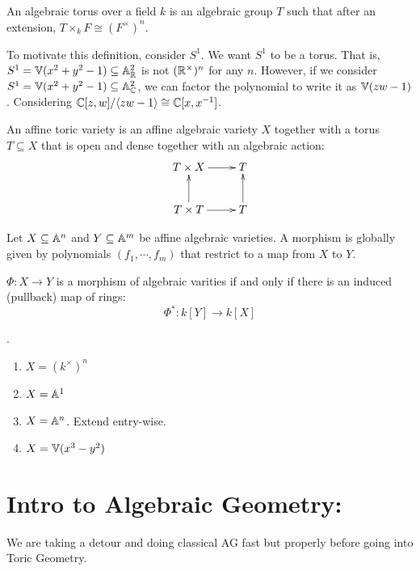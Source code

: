 \documentclass[12pt]{article}
\begin{document}
\begin{definition}
    An algebraic torus over a field $k$ is an algebraic group $T$ such that after an extension, $T \times_k F \cong (F^\times)^n$. 
\end{definition}

\begin{remark}
    To motivate this definition, consider $S^1$. We want $S^1$ to be a torus. That is, $S^1 = \mathbb V(x^2+y^2-1) \subseteq \mathbb A^2_\mathbb R$ is not $(\mathbb R^\times)^n$ for any $n$. However, if we consider $S^1 = \mathbb V(x^2+y^2-1) \subseteq \mathbb A^2_\mathbb C$, we can factor the polynomial to write it as $\mathbb V(zw-1)$. Considering $\mathbb C[z,w]/\langle zw-1\rangle \cong \mathbb C[x, x^{-1}]$. 
\end{remark}

\begin{definition}
    An affine toric variety is an affine algebraic variety $X$ together with a torus $T \subseteq X$ that is open and dense together with an algebraic action: 
    \[ \xymatrix{T \times X \ar[r] & T \\ T \times T \ar[u] \ar[r] & T \ar[u] } \]
\end{definition}

\begin{definition}
    Let $X \subseteq \mathbb A^n$ and $Y \subseteq \mathbb A^m$ be affine algebraic varieties. A morphism is globally given by polynomials $(f_1, \cdots, f_m)$ that restrict to a map from $X$ to $Y$.
\end{definition}

\begin{lemma}
    $\Phi: X \to Y$ is a morphism of algebraic varities if and only if there is an induced (pullback) map of rings: 
    \[ \Phi^*: k[Y] \to k[X]\]
\end{lemma}

\begin{example}
    .
    \begin{enumerate}
        \item $X = (k^\times)^n$
        \item $X = \mathbb A^1$
        \item $X = \mathbb A^n$. Extend entry-wise. 
        \item $X = \mathbb V(x^3-y^2)$
    \end{enumerate}
\end{example}


\section{Intro to Algebraic Geometry:}
We are taking a detour and doing classical AG fast but properly before going into Toric Geometry. 
\end{document}
